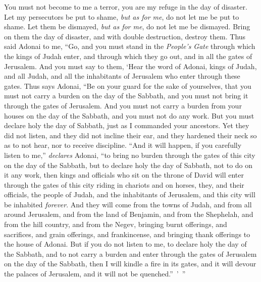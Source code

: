 \begin{biblechapter}
\verse You must not become to me a terror, 
you are my refuge in the day of disaster.
\verse Let my persecutors be put to shame, 
\textit{but as for me}, do not let me be put to shame. 
Let them be dismayed, 
\textit{but as for me}, do not let me be dismayed. 
Bring on them the day of disaster, 
and with double destruction, destroy them.
 Thus said Adonai to me, “Go, and you must stand in the \textit{People’s Gate} through which the kings of Judah enter, and through which they go out, and in all the gates of Jerusalem.
\verse And you must say to them, ‘Hear the word of Adonai, kings of Judah, and all Judah, and all the inhabitants of Jerusalem who enter through these gates.
\verse Thus says Adonai, “Be on your guard for the sake of yourselves, that you must not carry a burden on the day of the Sabbath, and you must not bring it through the gates of Jerusalem.
\verse And you must not carry a burden from your houses on the day of the Sabbath, and you must not do any work. But you must declare holy the day of Sabbath, just as I commanded your ancestors.
\verse Yet they did not listen, and they did not incline their ear, and they hardened their neck so as to not hear, nor to receive discipline.
\verse “And it will happen, if you carefully listen to me,” \textit{declares} Adonai, “to bring no burden through the gates of this city on the day of the Sabbath, but to declare holy the day of Sabbath, not to do on it any work,
\verse then kings and officials who sit on the throne of David will enter through the gates of this city riding in chariots and on horses, they, and their officials, the people of Judah, and the inhabitants of Jerusalem, and this city will be inhabited \textit{forever}.
\verse And they will come from the towns of Judah, and from all around Jerusalem, and from the land of Benjamin, and from the Shephelah, and from the hill country, and from the Negev, bringing burnt offerings, and sacrifices, and grain offerings, and frankincense, and bringing thank offerings to the house of Adonai.
\verse But if you do not listen to me, to declare holy the day of the Sabbath, and to not carry a burden and enter through the gates of Jerusalem on the day of the Sabbath, then I will kindle a fire in its gates, and it will devour the palaces of Jerusalem, and it will not be quenched.” ’ ”
\end{biblechapter}

